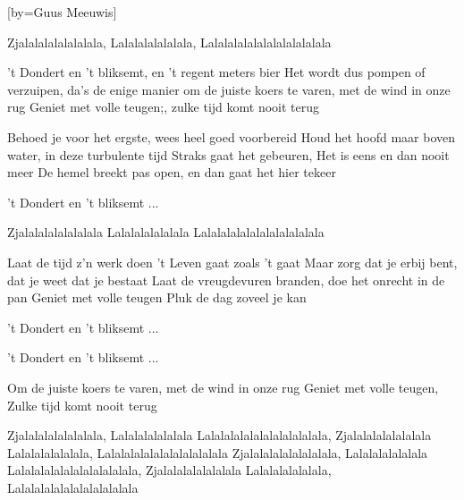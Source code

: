  

[by=Guus Meeuwis]




\beginchorus
Zjalalalalalalalala, \brk  Lalalalalalalala, \brk  Lalalalalalalalalalalalala
\endchorus

\beginchorus
't Dondert en 't bliksemt, \brk  en 't regent meters bier
Het wordt dus pompen of verzuipen, \brk  da's de enige manier
om de juiste koers te varen, \brk  met de wind in onze rug
Geniet met volle teugen;, \brk  zulke tijd komt nooit terug
\endchorus

\beginverse
Behoed je voor het ergste, \brk  wees heel goed voorbereid
Houd het hoofd maar boven water, \brk  in deze turbulente tijd
Straks gaat het gebeuren, \brk  Het is eens en dan nooit meer
De hemel breekt pas open, \brk  en dan gaat het hier tekeer
\endverse

\beginchorus
't Dondert en 't bliksemt ...
\endchorus

\beginchorus
Zjalalalalalalalala
Lalalalalalalala
Lalalalalalalalalalalalala
\endchorus

\beginverse
Laat de tijd z'n werk doen
't Leven gaat zoals 't gaat
Maar zorg dat je erbij bent,
dat je weet dat je bestaat
Laat de vreugdevuren branden,
doe het onrecht in de pan
Geniet met volle teugen
Pluk de dag zoveel je kan
\endverse

\beginchorus
't Dondert en 't bliksemt ...
\endchorus

\beginchorus
't Dondert en 't bliksemt ...
\endchorus

\beginchorus
Om de juiste koers te varen, \brk  met de wind in onze rug
Geniet met volle teugen, \brk  Zulke tijd komt nooit terug
\endchorus

\beginchorus
Zjalalalalalalalala, \brk  Lalalalalalalala
Lalalalalalalalalalalalala, \brk  Zjalalalalalalalala
Lalalalalalalala, \brk  Lalalalalalalalalalalalala
Zjalalalalalalalalala, \brk  Lalalalalalalala
Lalalalalalalalalalalalala, \brk  Zjalalalalalalalala
Lalalalalalalala, \brk  Lalalalalalalalalalalalala
\endchorus




\endsong
